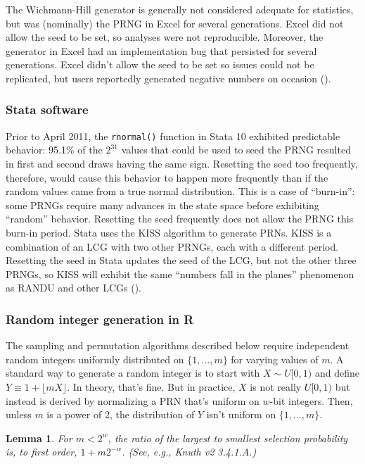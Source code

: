 \documentclass[12pt]{article}
\newtheorem{lemma}[theorem]{Lemma}
\newcommand{\todo}[1]{{\color{red}{TO DO: \sc #1}}}
\begin{document}
The Wichmann-Hill generator is generally not considered adequate for statistics, but was (nominally) the PRNG in Excel for several generations. 
Excel did not allow the seed to be set, so analyses were not reproducible.
Moreover, the generator in Excel had an implementation bug that persisted for several generations.
Excel didn't allow the seed to be set so issues could not be replicated, but users reportedly generated negative numbers on occasion (\cite{mccullough_microsoft_2008}).

\subsubsection{Stata software}
Prior to April 2011, the \texttt{rnormal()} function in Stata 10 exhibited predictable behavior:
95.1\% of the $2^{31}$ values that could be used to seed the PRNG resulted in first and second draws having the same sign.
Resetting the seed too frequently, therefore, would cause this behavior to happen more frequently than if the 
random values came from a true normal distribution.
This is a case of ``burn-in'': some PRNGs require many advances in the state space before exhibiting ``random'' behavior.
Resetting the seed frequently does not allow the PRNG this burn-in period.
Stata uses the KISS algorithm to generate PRNs.
KISS is a combination of an LCG with two other PRNGs, each with a different period.
 \todo{describe KISS and cite Marsaglia}
Resetting the seed in Stata updates the seed of the LCG, but not the other three PRNGs, so KISS will exhibit the same
``numbers fall in the planes'' phenomenon as RANDU and other LCGs (\cite{ozier_perils_2012}).

\subsubsection{Random integer generation in R}
The sampling and permutation algorithms described below require independent random integers
uniformly distributed on $\{1, \dots, m\}$ for varying values of $m$.
A standard way to generate a random integer is to start with $X \sim U[0,1)$ and define $Y \equiv 1 + \lfloor mX \rfloor$. 
In theory, that's fine. 
But in practice, $X$ is not really $U[0,1)$ but instead is derived by normalizing a PRN that's uniform on $w$-bit integers. 
Then, unless $m$ is a power of 2, the distribution of $Y$ isn't uniform on $\{1, \ldots, m\}$. 

\begin{lemma}
For $m < 2^w$, the ratio of the largest to smallest selection probability is, to first order,  $1+ m 2^{-w}$. (See, e.g., Knuth v2 3.4.1.A.)
\end{lemma}
\end{document}
